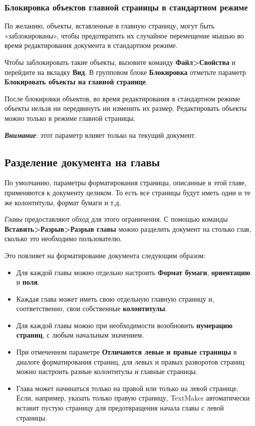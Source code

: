 \documentclass[a4paper,10pt]{article}
\begin{document}
\subsubsection{Блокировка объектов главной страницы в стандартном режиме}
По желанию, объекты, вставленные в главную страницу, могут быть «заблокированы», чтобы предотвратить их случайное перемещение мышью во время редактирования документа в стандартном режиме.  

Чтобы заблокировать такие объекты, вызовите команду \textbf{Файл>Свойства} и перейдите на вкладку \textbf{Вид}. В групповом блоке \textbf{Блокировка} отметьте параметр \textbf{Блокировать объекты на главной странице}.

После блокировки объектов, во время редактирования в стандартном режиме объекты нельзя ни передвинуть ни изменить их размер. Редактировать объекты можно только в режиме главной страницы.

\textbf{\textit{Внимание}}: этот параметр влияет только на текущий документ.

\subsection{Разделение документа на главы}
По умолчанию, параметры форматирования страницы, описанные в этой главе, применяются к документу целиком. То есть все страницы будут иметь одни и те же колонтитулы, формат бумаги и т.д.

\textit{Главы} предоставляют обход для этого ограничения. С помощью команды \textbf{Вставить>Разрыв>Разрыв главы} можно разделить документ на столько глав, сколько это необходимо пользователю. 

Это повлияет на форматирование документа следующим образом:

\begin{itemize}
 \item Для каждой главы можно отдельно настроить \textbf{Формат бумаги}, \textbf{ориентацию} и \textbf{поля}.
 \item Каждая глава может иметь свою отдельную главную страницу и, соответственно, свои собственные \textbf{колонтитулы}.
 \item Для каждой главы можно при необходимости возобновить \textbf{нумерацию страниц}, с любым начальным значением.
 \item При отмеченном параметре \textbf{Отличаются левые и правые страницы} в диалоге форматирования страниц, для левых и правых разворотов страниц можно настроить разные колонтитулы и главные страницы.
 \item Глава может начинаться только на правой или только на левой странице. Если, например, указать только правую страницу, TextMaker автоматически вставит пустую страницу для предотвращения начала главы с левой страницы.
\end{itemize}
\end{document}
